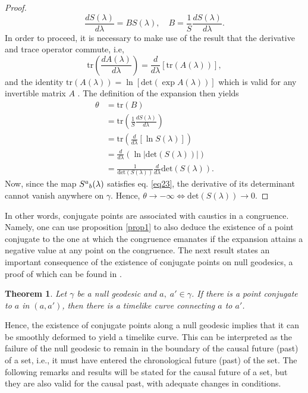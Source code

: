 \documentclass[
12pt,		%
openright,	%
twoside,  %
a4paper,			%
chapter=TITLE,		%
english,			%
french,				%
spanish,			%
brazil				%
]{USPSC-classe/USPSC}
\newtheorem{theorem}{Theorem}[section]
\begin{document}
\begin{proof}
\begin{equation}
    \frac{dS(\lambda)}{d\lambda}=BS(\lambda),\quad B=\frac{1}{S}\frac{dS(\lambda)}{d\lambda}.
\end{equation}
In order to proceed, it is necessary to make use of the result that the derivative and trace operator commute, i.e,
\begin{equation}
    \text{tr}\left(\frac{dA(\lambda)}{d\lambda}\right)=\frac{d}{d\lambda}\left[\text{tr}(A(\lambda))\right],
\end{equation}
and the identity $\text{tr}(A(\lambda))=\ln{\left[\text{det}(\exp{A(\lambda)})\right]}$ which is valid for any invertible matrix $A$ \cite{Magnus1999}. The definition of the expansion then yields
\begin{equation}
\begin{aligned}
\theta &=\text{tr}(B)\\
&=\text{tr}\left(\frac{1}{S}\frac{dS(\lambda)}{d\lambda}\right)\\
&=\text{tr}\left(\frac{d}{d\lambda}\left[\ln{S(\lambda)}\right]\right)\\
&=\frac{d}{d\lambda}(\ln|\text{det} (S(\lambda))|)\\
&=\frac{1}{\text{det} (S(\lambda))}\frac{d}{d\lambda}\text{det} (S(\lambda)).
\end{aligned}
\end{equation}
Now, since the map $S^{a}\mathstrut_{b}(\lambda)$ satisfies eq. \ref{eq23}, the derivative of its determinant cannot vanish anywhere on $\gamma$. Hence, $\theta\to-\infty\Leftrightarrow\text{det} (S(\lambda))\to 0$. 
\end{proof}

In other words, conjugate points are associated with caustics in a congruence. Namely, one can use proposition \ref{prop1} to also deduce the existence of a point conjugate to the one at which the congruence emanates if the expansion attains a negative value at any point on the congruence. The next result states an important consequence of the existence of conjugate points on null geodesics, a proof of which can be found in \cite{Penrose1972}.

\begin{theorem}\label{theorem4}
    Let $\gamma$ be a null geodesic and $a,\;a'\in\gamma$. If there is a point conjugate to $a$ in $(a,a')$, then there is a timelike curve connecting $a$ to $a'$.
\end{theorem}

Hence, the existence of conjugate points along a null geodesic implies that it can be smoothly deformed to yield a timelike curve. This can be interpreted as the failure of the null geodesic to remain in the boundary of the causal future (past) of a set, i.e., it must have entered the chronological future (past) of the set. The following remarks and results will be stated for the causal future of a set, but they are also valid for the causal past, with adequate changes in conditions.
\end{document}
